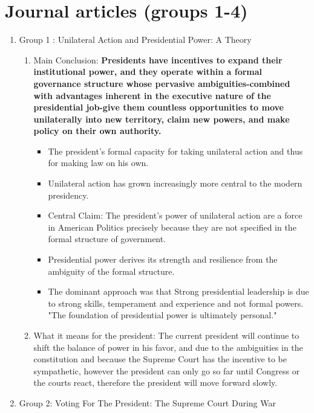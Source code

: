 \documentclass{article}
\begin{document}
\section*{Journal articles (groups 1-4)}
\begin{enumerate}
    \item Group 1 : Unilateral Action and Presidential Power: A Theory\\
    
    \begin{enumerate}
        \item \color{red} Main Conclusion: \color{black} \textbf{Presidents have incentives to expand their institutional power, and they operate within a formal governance structure whose pervasive ambiguities-combined 
with advantages inherent in the executive nature of the presidential job-give them countless opportunities to move unilaterally into new territory, claim new powers, and make
policy on their own authority.}
        \begin{itemize}
            \item The president's formal capacity for taking unilateral action and thus for making law on his own.
            \item Unilateral action has grown increasingly more central to the modern presidency. 
            \item Central Claim: The president's power of unilateral action are a force in American Politics precisely because they are not specified in the formal structure of government. 
            \item Presidential power derives its strength and resilience from the ambiguity of the formal structure. 
            \item The dominant approach was that Strong presidential leadership is due to strong skills, temperament and experience and not  formal powers. "The foundation of presidential power is ultimately personal." 
        \end{itemize}
        \item \color{red} What it means for the president: \color{black} The current president will continue to shift the balance of power in his favor, and due to the ambiguities in the constitution and because the Supreme Court has the incentive to be sympathetic, however the president can only go so far until  Congress or the courts react, therefore the president will move forward slowly. 
    \end{enumerate}
    \color{black}
    \item Group 2: Voting For The President: The Supreme Court During War

\end{enumerate}
\end{document}
